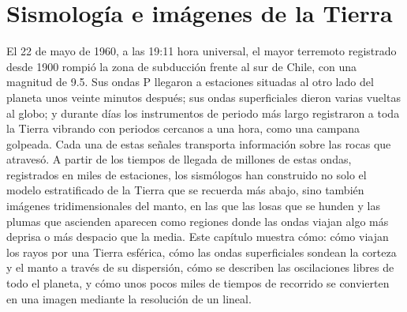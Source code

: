 \chapter{Sismología e imágenes de la Tierra}\label{ch:b3:seismology-imaging}

El 22 de mayo de 1960, a las 19:11 hora universal, el mayor terremoto registrado desde
1900 rompió la zona de subducción frente al sur de Chile, con una magnitud de 9.5.
Sus ondas P llegaron a estaciones situadas al otro lado del planeta unos veinte minutos
después; sus ondas superficiales dieron varias vueltas al globo; y durante días
los instrumentos de periodo más largo registraron a toda la Tierra vibrando con
periodos cercanos a una hora, como una campana golpeada. Cada una de estas señales transporta
información sobre las rocas que atravesó. A partir de los tiempos de llegada de millones de
estas ondas, registrados en miles de estaciones, los sismólogos han construido no solo
el modelo estratificado de la Tierra que se recuerda más abajo, sino también imágenes tridimensionales del
manto, en las que las losas que se hunden y las plumas que ascienden aparecen como regiones donde
las ondas viajan algo más deprisa o más despacio que la media. Este capítulo muestra cómo:
cómo viajan los rayos por una Tierra esférica, cómo las ondas superficiales sondean la corteza
y el manto a través de su dispersión, cómo se describen las oscilaciones libres de todo el
planeta, y cómo unos pocos miles de tiempos de recorrido se convierten en una
imagen mediante la resolución de un  lineal.

